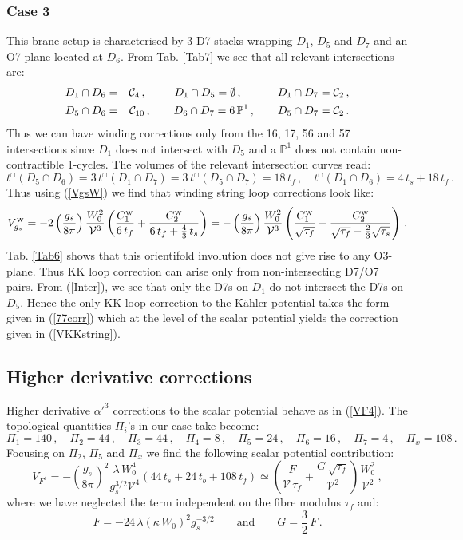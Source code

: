 \documentclass[11pt,a4paper]{article}
\newcommand{\bea}{\begin{eqnarray}}
\newcommand{\eea}{\end{eqnarray}}
\newcommand{\be}{\begin{equation}}
\newcommand{\ee}{\end{equation}}
\def\nn{\nonumber}
\def\W{{\scriptscriptstyle \rm W}}
\def\P{{\mathbb P}}
\newcommand\vo{{\mathcal{V}}}
\newcommand{\mc}{\mathcal}
\begin{document}
\subsubsection{Case 3}

This brane setup is characterised by 3 D7-stacks wrapping $D_1$, $D_5$ and $D_7$ and an O7-plane located at $D_6$. From Tab. \ref{Tab7} we see that all relevant intersections are:
\bea
D_1 \cap D_6 &=&\mc{C}_4\,,\qquad \,\,\,D_1 \cap D_5 = \emptyset\,, \qquad\quad\, D_1\cap D_7 = {\cal C}_2\,, \nn \\
D_5 \cap D_6 &=&\mc{C}_{10}\,,\qquad D_6\cap D_7=6\,\P^1\,,\qquad D_5\cap D_7={\cal C}_2\,. 
\label{Inter}
\eea
Thus we can have winding corrections only from the 16, 17, 56 and 57 intersections since $D_1$ does not intersect with $D_5$ and a $\P^1$ does not contain non-contractible 1-cycles. The volumes of the relevant intersection curves read:
\be
t^\cap(D_5 \cap D_6)= 3\,t^\cap(D_1 \cap D_7)  = 3\,t^\cap(D_5 \cap D_7) = 18 \, t_f\,,\quad t^\cap(D_1 \cap D_6) = 4\,t_s+18\,t_f\,.
\ee
Thus using (\ref{VgsW}) we find that winding string loop corrections look like:
\be
V_{g_s}^\W=-2\left(\frac{g_s}{8\pi}\right) \frac{W_0^2}{\vo^3} \left( \frac{C_1^\W}{6 \, t_f}+ \frac{C_2^\W}{6 \, t_f+\frac43\,t_s} \right)
= -\left(\frac{g_s}{8\pi}\right) \frac{W_0^2}{\vo^3} \left(\frac{C_1^\W}{\sqrt{\tau_f}}+\frac{C_2^\W}{\sqrt{\tau_f}-\frac23\sqrt{\tau_s}}\right)\,.
\label{VWnew3}
\ee
Tab. \ref{Tab6} shows that this orientifold involution does not give rise to any O3-plane. Thus KK loop correction can arise only from non-intersecting D7/O7 pairs. From (\ref{Inter}), we see that only the D7s on $D_1$ do not intersect the D7s on $D_5$. Hence the only KK loop correction to the K\"ahler potential takes the form given in (\ref{77corr}) which at the level of the scalar potential yields the correction given in (\ref{VKKstring}).


\subsection{Higher derivative corrections}

Higher derivative $\alpha'^3$ corrections to the scalar potential behave as in (\ref{VF4}). The topological quantities $\Pi_i$'s in our case take become: 
\be
\Pi_1 =140\,,\quad \Pi_2 =44\,,\quad \Pi_3 =44\,, \quad \Pi_4 =8\,, \quad \Pi_5 =24\,,\quad \Pi_6 = 16\,,  \quad \Pi_7 =4\,,\quad \Pi_x = 108\,. \nn
\ee
Focusing on $\Pi_2$, $\Pi_5$ and $\Pi_x$ we find the following scalar potential contribution:
\be
V_{F^4} = - \left(\frac{g_s}{8\pi}\right)^2 \frac{\lambda\, W_0^4}{g_s^{3/2}\vo^4} \left(44 \,t_s + 24 \,t_b + 108\, t_f\right)
\simeq \left(\frac{F}{\vo\,\tau_f}+\frac{G \, \sqrt{\tau_f}}{\vo^2} \right) \frac{W_0^2}{\vo^2}\,,
\ee
where we have neglected the term independent on the fibre modulus $\tau_f$ and: 
\be
F = -24 \,\lambda \left(\kappa\, W_0\right)^2 g_s^{-3/2} \qquad\text{and}\qquad G = \frac32\,F\,.
\ee
\end{document}
